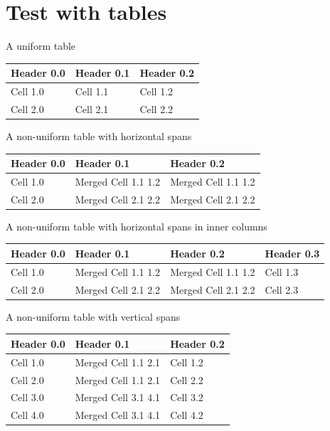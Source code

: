 \documentclass[11pt,a4paper]{article}
\begin{document}
\section{Test with tables}

A uniform table

\begin{table}[h]
\begin{tabular}{|l|l|l|}
\hline
Header 0.0 & Header 0.1 & Header 0.2 \\ \hline
Cell 1.0 & Cell 1.1 & Cell 1.2 \\ \hline
Cell 2.0 & Cell 2.1 & Cell 2.2 \\ \hline
\end{tabular}
\end{table}

A non-uniform table with horizontal spans

\begin{table}[h]
\begin{tabular}{|l|l|l|}
\hline
Header 0.0 & Header 0.1 & Header 0.2 \\ \hline
Cell 1.0 & Merged Cell 1.1 1.2 & Merged Cell 1.1 1.2 \\ \hline
Cell 2.0 & Merged Cell 2.1 2.2 & Merged Cell 2.1 2.2 \\ \hline
\end{tabular}
\end{table}

A non-uniform table with horizontal spans in inner columns

\begin{table}[h]
\begin{tabular}{|l|l|l|l|}
\hline
Header 0.0 & Header 0.1 & Header 0.2 & Header 0.3 \\ \hline
Cell 1.0 & Merged Cell 1.1 1.2 & Merged Cell 1.1 1.2 & Cell 1.3 \\ \hline
Cell 2.0 & Merged Cell 2.1 2.2 & Merged Cell 2.1 2.2 & Cell 2.3 \\ \hline
\end{tabular}
\end{table}

A non-uniform table with vertical spans

\begin{table}[h]
\begin{tabular}{|l|l|l|}
\hline
Header 0.0 & Header 0.1 & Header 0.2 \\ \hline
Cell 1.0 & Merged Cell 1.1 2.1 & Cell 1.2 \\ \hline
Cell 2.0 & Merged Cell 1.1 2.1 & Cell 2.2 \\ \hline
Cell 3.0 & Merged Cell 3.1 4.1 & Cell 3.2 \\ \hline
Cell 4.0 & Merged Cell 3.1 4.1 & Cell 4.2 \\ \hline
\end{tabular}
\end{table}
\end{document}
